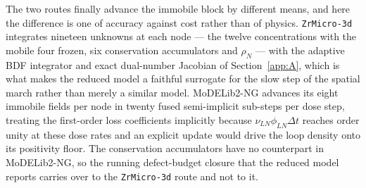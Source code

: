 \documentclass{article}
\newcommand{\ZrM}{\texttt{ZrMicro-3d}}
\newcommand{\MoDNG}{\textsf{MoDELib2-NG}}
\begin{document}
The two routes finally advance the immobile block by different means, and here the
difference is one of accuracy against cost rather than of physics. {\ZrM}
integrates nineteen unknowns at each node --- the twelve concentrations with the
mobile four frozen, six conservation accumulators and $\rho_N$ --- with the
adaptive BDF integrator and exact dual-number Jacobian of Section~\ref{app:A},
which is what makes the reduced model a faithful surrogate for the slow step of
the spatial march rather than merely a similar model. {\MoDNG} advances its eight
immobile fields per node in twenty fused semi-implicit sub-steps per dose step,
treating the first-order loss coefficients implicitly because
$\nu_{LN}\phi_{LN}\Delta t$ reaches order unity at these dose rates and an explicit
update would drive the loop density onto its positivity floor. The conservation
accumulators have no counterpart in {\MoDNG}, so the running defect-budget closure
that the reduced model reports carries over to the {\ZrM} route and not to it.
\end{document}
